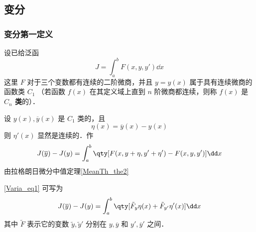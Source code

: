\subsection{变分}
\subsubsection{变分第一定义}
设已给泛函
\begin{equation}
J=\int_a^b F(x,y,y')\dd x
\end{equation}
这里 $F$ 对于三个变数都有连续的二阶微商，并且 $y=y(x)$ 属于具有连续微商的函数类 $C_1$ （若函数 $f(x)$ 在其定义域上直到 $n$ 阶微商都连续，则称 $f(x)$ 是\textbf{ $C_n$ 类}的）．

设 $y(x),\overline{y}(x)$ 是 $C_1$ 类的，且
\begin{equation}
\eta(x)=\overline{y}(x)-y(x)
\end{equation}
则 $\eta'(x)$ 显然是连续的．作
\begin{equation}\label{Varia_eq1}
J(\overline{y})-J(y)=\int_a^b\qty[F(x,y+\eta,y'+\eta')-F(x,y,y')]\dd x
\end{equation}
由拉格朗日微分中值定理\autoref{MeanTh_the2}~
\begin{issues}
\end{issues}
\autoref{Varia_eq1} 可写为
\begin{equation}
J(\overline{y})-J(y)=\int_a^b\qty[\tilde{F}_y\eta(x)+\tilde{F}_{y'}\eta'(x)]\dd x
\end{equation}
其中 $\tilde{F}$ 表示它的变数 $\tilde{y},\tilde{y}'$ 分别在 $y,\overline{y}$ 和 $y',\overline{y}'$ 之间．

